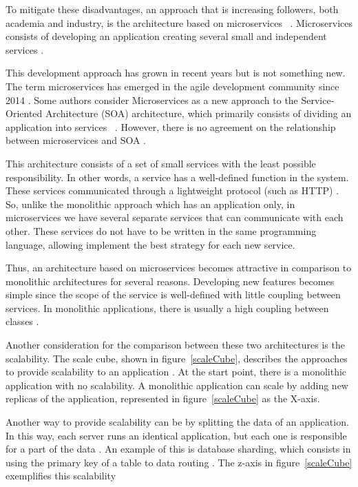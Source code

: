 To mitigate these disadvantages, an approach that is increasing followers, both academia and industry, is the architecture based on microservices ~\cite{Chen2017FromApproach}. Microservices consists of developing an application creating several small and independent services \cite{Namiot2014OnArchitecture}. 

This development approach has grown in recent years but is not something new. The term microservices has emerged in the agile development community since 2014 \cite{Zimmermann2017MicroservicesDeployment}. Some authors consider Microservices as a new approach to the Service-Oriented Architecture (SOA) architecture, which primarily consists of dividing an application into services ~\cite{Zimmermann2017MicroservicesDeployment}. However, there is no agreement on the relationship between microservices and SOA \cite{Chen2017FromApproach}.

This architecture consists of a set of small services with the least possible responsibility. In other words, a service has a well-defined function in the system. These services communicated through a lightweight protocol (such as HTTP) \cite{Namiot2014OnArchitecture}. So, unlike the monolithic approach which has an application only, in microservices we have several separate services that can communicate with each other. These services do not have to be written in the same programming language, allowing implement the best strategy for each new service.

Thus, an architecture based on microservices becomes attractive in comparison to monolithic architectures for several reasons. Developing new features becomes simple since the scope of the service is well-defined with little coupling between services. In monolithic applications, there is usually a high coupling between classes \cite{Namiot2014OnArchitecture}. 

Another consideration for the comparison between these two architectures is the scalability. The scale cube, shown in figure~\ref{scaleCube}, describes the approaches to provide scalability to an application \cite{Namiot2014OnArchitecture}. At the start point, there is a monolithic application with no scalability. A monolithic application can scale by adding new replicas of the application, represented in figure~\ref{scaleCube} as the X-axis.

Another way to provide scalability can be by splitting the data of an application. In this way, each server runs an identical application, but each one is responsible for a part of the data \cite{Namiot2014OnArchitecture}. An example of this is database sharding, which consists in using the primary key of a table to data routing \cite{Namiot2014OnArchitecture}. The z-axis in figure~\ref{scaleCube} exemplifies this scalability


